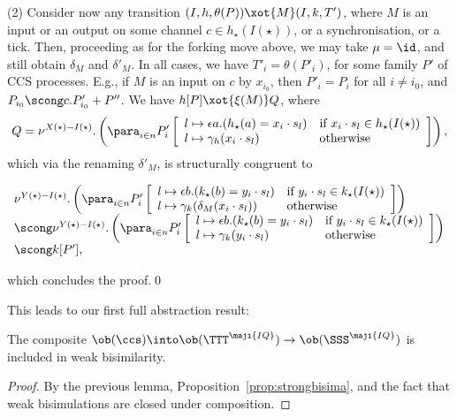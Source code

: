 \documentclass{LMCS}
\renewcommand{\QFI}{\maji{IQ}}
\renewcommand{\LLL}{\QFI}
\renewcommand{\SSSL}{\SSS^{\LLL}}
\renewcommand{\TTTL}{\TTT^{\LLL}}
\theoremstyle{plain}\newtheorem{satz}[thm]{Satz}
\begin{document}
(2) Consider now any transition $(I,h,\theta(P)) \xot{M} (I,k,T')$,
where $M$ is an input or an output on some channel $c \in h_\star (I
(\star))$, or a synchronisation, or a tick. Then, proceeding as for the forking move above,
we may take $\mu = \id$, and still obtain $\delta_M$ and $\delta'_M$.
In all cases, we have $T'_i = \theta(P'_i)$, for some family $P'$
of CCS processes. E.g., if $M$ is an input on $c$ by $x_{i_0}$,
then $P'_i = P_i$ for all $i \neq i_0$, and $P_{i_0} \scong c.P'_{i_0} + P''$.
We have $h[P] \xot{\xi(M)} Q$, where
$$Q = \nu^{X (\star) - I (\star)}. \left (\para_{i \in n} P'_i\left [
  \begin{array}[c]{ll}
    l \mapsto \epsilon a.(h_\star(a) = x_i \cdot s_l) & \mbox{if $x_i \cdot s_l \in h_\star (I(\star))$} \\
    l \mapsto \gamma_h(x_i \cdot s_l) & \mbox{otherwise} 
  \end{array}
\right ] \right ), $$
which via the renaming $\delta'_M$, is structurally congruent to 
\begin{center}
  $ \begin{array}[b]{l} \nu^{Y (\star) - I (\star)}. \left (\para_{i
        \in n} P'_i\left [
        \begin{array}[c]{ll}
          l \mapsto \epsilon b.(k_\star(b) = y_i \cdot s_l) & \mbox{if $y_i \cdot s_l \in k_\star (I(\star))$} \\
          l \mapsto \gamma_k(\delta_M(x_i \cdot s_l)) & \mbox{otherwise} 
        \end{array}
      \right ] \right ) \\
    {} \scong 
    \nu^{Y (\star) - I (\star)}. \left (\para_{i \in n} P'_i\left [
        \begin{array}[c]{ll}
          l \mapsto \epsilon b.(k_\star(b) = y_i \cdot s_l) & \mbox{if $y_i \cdot s_l \in k_\star (I(\star))$} \\
          l \mapsto \gamma_k(y_i \cdot s_l) & \mbox{otherwise} 
        \end{array}
      \right ] \right ) \\
    {} \scong k[P'],
  \end{array}$
\end{center}
which concludes the proof.\qed


This leads to our first full abstraction result:
\begin{cor}\label{cor:wbisim}
  The composite $\ob(\ccs) \into \ob (\TTTL) \to \ob (\SSSL)$ is included in weak bisimilarity.
\end{cor}
\begin{proof}
  By the previous lemma, Proposition~\ref{prop:strongbisima}, and
  the fact that weak bisimulations are closed under composition.
\end{proof}
\end{document}
